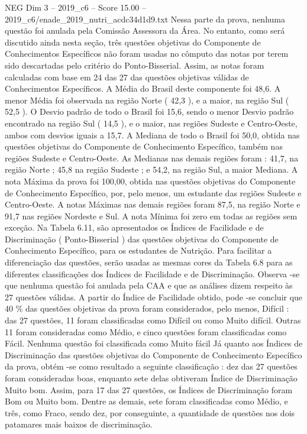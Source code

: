 \begin{textsample}{NEG Dim 3 – 2019\_c6 – Score 15.00 – 2019\_c6/enade\_2019\_nutri\_acdc34d1d9.txt}
Nessa parte da prova, nenhuma questão foi anulada pela Comissão Assessora da Área.
No entanto, como será discutido ainda nesta seção, três questões objetivas do Componente de Conhecimentos Específicos não foram usadas no cômputo das notas por terem sido descartadas pelo critério do Ponto-Bisserial.
Assim, as notas foram calculadas com base em 24 das 27 das questões objetivas válidas de Conhecimentos Específicos.
A Média do Brasil deste componente foi 48,6.
A menor Média foi observada na região Norte ( 42,3 ), e a maior, na região Sul ( 52,5 ).
O Desvio padrão de todo o Brasil foi 15,6, sendo o menor Desvio padrão encontrado na região Sul ( 14,5 ), e o maior, nas regiões Sudeste e Centro-Oeste, ambos com desvios iguais a 15,7.
A Mediana de todo o Brasil foi 50,0, obtida nas questões objetivas do Componente de Conhecimento Específico, também nas regiões Sudeste e Centro-Oeste.
As Medianas nas demais regiões foram : 41,7, na região Norte ; 45,8 na região Sudeste ; e 54,2, na região Sul, a maior Mediana.
A nota Máxima da prova foi 100,00, obtida nas questões objetivas do Componente de Conhecimento Específico, por, pelo menos, um estudante das regiões Sudeste e Centro-Oeste.
A notas Máximas nas demais regiões foram 87,5, na região Norte e 91,7 nas regiões Nordeste e Sul.
A nota Mínima foi zero em todas as regiões sem exceção.
Na Tabela 6.11, são apresentados os Índices de Facilidade e de Discriminação ( Ponto-Bisserial ) das questões objetivas do Componente de Conhecimento Específico, para os estudantes de Nutrição.
Para facilitar a diferenciação das questões, serão usadas as mesmas cores da Tabela 6.8 para as diferentes classificações dos Índices de Facilidade e de Discriminação.
Observa -se que nenhuma questão foi anulada pela CAA e que as análises dizem respeito às 27 questões válidas.
A partir do Índice de Facilidade obtido, pode -se concluir que 40 \% das questões objetivas da prova foram considerados, pelo menos, Difícil : das 27 questões, 11 foram classificadas como Difícil ou como Muito difícil.
Outras 11 foram consideradas como Médio, e cinco questões foram classificadas como Fácil.
Nenhuma questão foi classificada como Muito fácil Já quanto aos Índices de Discriminação das questões objetivas do Componente de Conhecimento Específico da prova, obtém -se como resultado a seguinte classificação : dez das 27 questões foram consideradas boas, enquanto sete delas obtiveram Índice de Discriminação Muito bom.
Assim, para 17 das 27 questões, os Índices de Discriminação foram Bom ou Muito bom.
Dentre as demais, sete foram classificadas como Médio, e três, como Fraco, sendo dez, por conseguinte, a quantidade de questões nos dois patamares mais baixos de discriminação.

\end{textsample}
